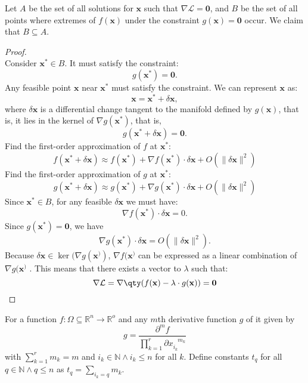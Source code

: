 \documentclass[a4paper,12pt]{report}
\begin{document}
\begin{itemize}
\begin{itemize}
 Let $A$ be the set of all solutions for \( \mathbf{x} \) such that $\nabla \mathcal{L} = \mathbf{0}$, and $B$ be the set of all points where extremes of \( f(\mathbf{x}) \) under the constraint \( g(\mathbf{x}) = \mathbf{0}\) occur. We claim that $B\subseteq A$.
\begin{proof}\mbox{}\\
Consider $\mathbf{x}^*\in B$. It must satisfy the constraint:
\[g(\mathbf{x}^*) = \mathbf{0}.\]
Any feasible point $\mathbf{x}$ near $\mathbf{x}^*$ must satisfy the constraint. We can represent $\mathbf{x}$ as:
\[\mathbf{x} = \mathbf{x}^* + \delta\mathbf{x},\]
where $\delta\mathbf{x}$ is a differential change tangent to the manifold defined by $g(\mathbf{x})$, that is, it lies in the kernel of $\nabla g(\mathbf{x}^*)$, that is,
\[g(\mathbf{x}^* + \delta\mathbf{x}) = \mathbf{0}.\]
Find the first-order approximation of $f$ at $\mathbf{x}^*$:
\[f(\mathbf{x}^*+ \delta\mathbf{x}) \approx f(\mathbf{x}^*) + \nabla f(\mathbf{x}^*) \cdot \delta\mathbf{x} + O(\|\delta\mathbf{x}\|^2)\]
Find the first-order approximation of $g$ at $\mathbf{x}^*$:
\[g(\mathbf{x}^*+ \delta\mathbf{x}) \approx g(\mathbf{x}^*) + \nabla g(\mathbf{x}^*) \cdot \delta\mathbf{x} + O(\|\delta\mathbf{x}\|^2)\]
Since $\mathbf{x}^*\in B$, for any feasible $\delta\mathbf{x}$ we must have:
\[\nabla f(\mathbf{x}^*) \cdot \delta\mathbf{x} = 0.\]
Since $g(\mathbf{x}^*) = \mathbf{0}$, we have
\[\nabla g(\mathbf{x}^*) \cdot \delta\mathbf{x} = O(\|\delta\mathbf{x}\|^2).\]
Because \( \delta\mathbf{x} \in \ker(\nabla g(\mathbf{x}^)) \), \( \nabla f(\mathbf{x}^) \) can be expressed as a linear combination of \( \nabla g(\mathbf{x}^) \) . This means that there exists a vector to $\lambda$ such that:
\[\nabla\mathcal{L} = \nabla \qty(f(\mathbf{x}) - \lambda \cdot g(\mathbf{x})) = \mathbf{0} \]
\end{proof}
For a function $f\colon\Omega\subseteq\mathbb{R}^n\to\mathbb{R}^o$ and any $m$th derivative function $g$ of it given by
\[g=\frac{\partial^mf}{\prod_{k=1}^r\partial x_{i_k}^{\phantom{i_k}m_k}}\]
with $\sum_{k=1}^rm_k=m$ and $i_k\in\mathbb{N}\land i_k\leq n$ for all $k$. Define constants $t_q$ for all $q\in\mathbb{N}\land q\leq n$ as $t_q=\sum_{i_k=q}m_k$. 


\end{itemize}
\end{itemize}
\end{document}
